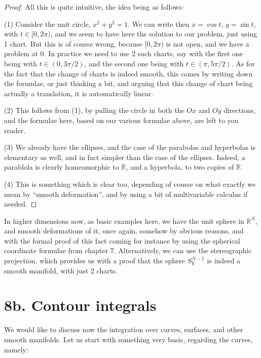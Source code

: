 \documentclass[12pt]{amsbook}
\begin{document}
\begin{proof}
All this is quite intuitive, the idea being as follows:

\medskip

(1) Consider the unit circle, $x^2+y^2=1$. We can write then $x=\cos t$, $y=\sin t$, with $t\in[0,2\pi)$, and we seem to have here the solution to our problem, just using 1 chart. But this is of course wrong, because $[0,2\pi)$ is not open, and we have a problem at $0$. In practice we need to use 2 such charts, say with the first one being with $t\in(0,3\pi/2)$, and the second one being with $t\in(\pi,5\pi/2)$. As for the fact that the change of charts is indeed smooth, this comes by writing down the formulae, or just thinking a bit, and arguing that this change of chart being actually a translation, it is automatically linear.

\medskip

(2) This follows from (1), by pulling the circle in both the $Ox$ and $Oy$ directions, and the  formulae here, based on our various formulae above, are left to you reader.

\medskip

(3) We already have the ellipses, and the case of the parabolas and hyperbolas is elementary as well, and in fact simpler than the case of the ellipses. Indeed, a parablola is clearly homeomorphic to $\mathbb R$, and a hyperbola, to two copies of $\mathbb R$.

\medskip

(4) This is something which is clear too, depending of course on what exactly we mean by ``smooth deformation'', and by using a bit of multivariable calculus if needed.
\end{proof}

In higher dimensions now, as basic examples here, we have the unit sphere in $\mathbb R^N$, and smooth deformations of it, once again, somehow by obvious reasons, and with the formal proof of this fact coming for instance by using the spherical coordinate formulae from chapter 7. Alternatively, we can use the stereographic projection, which provides us with a proof that the sphere $S^{N-1}_\mathbb R$ is indeed a smooth manifold, with just 2 charts.

\section*{8b. Contour integrals}

We would like to discuss now the integration over curves, surfaces, and other smooth manifolds. Let us start with something very basic, regarding the curves, namely:
\end{document}
